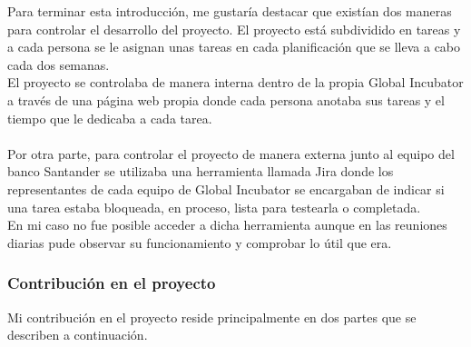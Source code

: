 \documentclass[a4paper,12pt]{article}
\begin{document}
Para terminar esta introducción, me gustaría destacar que existían dos maneras para controlar el desarrollo del proyecto. El proyecto está subdividido en tareas y a cada persona se le asignan unas tareas en cada planificación que se lleva a cabo cada dos semanas.\\
El proyecto se controlaba de manera interna dentro de la propia Global Incubator a través de una página web propia donde cada persona anotaba sus tareas y el tiempo que le dedicaba a cada tarea.\\
\\
Por otra parte, para controlar el proyecto de manera externa junto al equipo del banco Santander se utilizaba una herramienta llamada Jira donde los representantes de cada equipo de Global Incubator se encargaban de indicar si una tarea estaba bloqueada, en proceso, lista para testearla o completada.\\
En mi caso no fue posible acceder a dicha herramienta aunque en las reuniones diarias pude observar su funcionamiento y comprobar lo útil que era.


\subsubsection{Contribución en el proyecto}

Mi contribución en el proyecto reside principalmente en dos partes que se describen a continuación.
\end{document}
